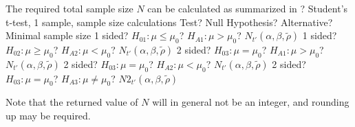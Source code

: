 \mpTableFourColsTwoRowsThreeRows
{The required total sample size $N$ can be calculated as summarized in ? Student's t-test, 1 sample, sample size calculations}
{Test? Null Hypothesis? Alternative? Minimal sample size}
{1 sided? $H_{01}: \mu \leq \mu_0$? $H_{A1}: \mu > \mu_0$? $N_{t'}\left(\alpha, \beta, \widetilde{\rho} \right)$}
{1 sided? $H_{02}: \mu \geq \mu_0$? $H_{A2}: \mu < \mu_0$? $N_{t'}\left(\alpha, \beta, \widetilde{\rho} \right)$}
{2 sided? $H_{03}: \mu = \mu_0$? $H_{A1}: \mu > \mu_0$? $N_{t'}\left(\alpha, \beta, \widetilde{\rho} \right)$}
{2 sided? $H_{03}: \mu = \mu_0$? $H_{A2}: \mu < \mu_0$? $N_{t'}\left(\alpha, \beta, \widetilde{\rho} \right)$}
{2 sided? $H_{03}: \mu = \mu_0$? $H_{A3}: \mu \neq \mu_0$? $N2_{t'}\left(\alpha, \beta, \widetilde{\rho} \right)$}

Note that the returned value of $N$ will in general not be an integer, and rounding up may be required.

%
%
%
%
%
%


